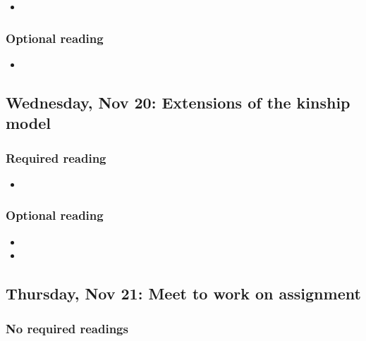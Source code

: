 ﻿\documentclass{article}
\begin{document}
\begin{itemize}
    \item {}
\end{itemize}

\subsubsection*{Optional reading}

\begin{itemize}
    \item {}
\end{itemize}


\subsection*{Wednesday, Nov 20: Extensions of the kinship model}

\subsubsection*{Required reading}

\begin{itemize}
   \item {}
\end{itemize}

\subsubsection*{Optional reading}

\begin{itemize}
     \item {}
     \item {}
\end{itemize}

\subsection*{Thursday, Nov 21: Meet to work on assignment}

\subsubsection*{No required readings}
\end{document}
